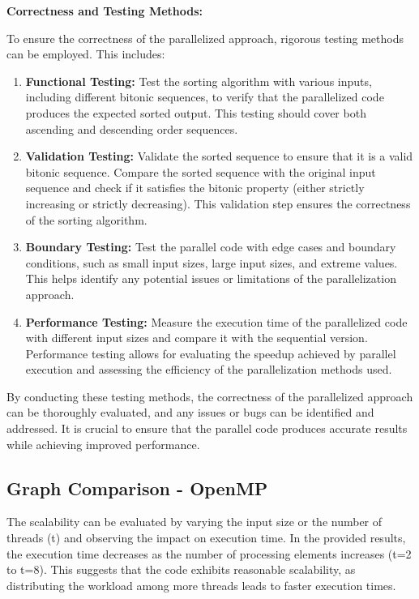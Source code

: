\newpage

\textbf{Correctness and Testing Methods:}

To ensure the correctness of the parallelized approach, rigorous testing methods can be employed. This includes:

\begin{enumerate}
\item \textbf{Functional Testing:} Test the sorting algorithm with various inputs, including different bitonic sequences, to verify that the parallelized code produces the expected sorted output. This testing should cover both ascending and descending order sequences.

\item \textbf{Validation Testing:} Validate the sorted sequence to ensure that it is a valid bitonic sequence. Compare the sorted sequence with the original input sequence and check if it satisfies the bitonic property (either strictly increasing or strictly decreasing). This validation step ensures the correctness of the sorting algorithm.

\item \textbf{Boundary Testing:} Test the parallel code with edge cases and boundary conditions, such as small input sizes, large input sizes, and extreme values. This helps identify any potential issues or limitations of the parallelization approach.

\item \textbf{Performance Testing:} Measure the execution time of the parallelized code with different input sizes and compare it with the sequential version. Performance testing allows for evaluating the speedup achieved by parallel execution and assessing the efficiency of the parallelization methods used.
\end{enumerate}

By conducting these testing methods, the correctness of the parallelized approach can be thoroughly evaluated, and any issues or bugs can be identified and addressed. It is crucial to ensure that the parallel code produces accurate results while achieving improved performance.

\subsection{Graph Comparison - OpenMP}
The scalability can be evaluated by varying the input size or the number of threads (t) and observing the impact on execution time. In the provided results, the execution time decreases as the number of processing elements increases (t=2 to t=8). This suggests that the code exhibits reasonable scalability, as distributing the workload among more threads leads to faster execution times.

